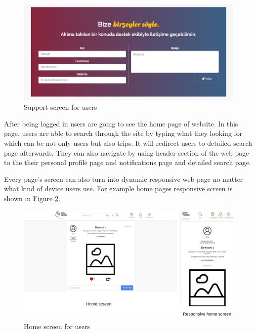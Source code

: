 \begin{figure}[!htbp]
\centering
\includegraphics[width=\textwidth]{projectChapters/images/supportPage.png}
\caption{Support screen for users}
\label{fig:supportWeb}
\end{figure}

\newpage

After being logged in users are going to see the home page of website. In this page, users are able to search through the site by typing what they looking for which can be not only users but also trips. It will redirect users to detailed search page afterwards. They can also navigate by using header section of the web page to the their personal profile page and notifications page and detailed search page.


Every page's screen can also turn into dynamic responsive web page no matter what kind of device users use. For example home pages responsive screen is shown in Figure  \ref{fig:homepageWeb}.

\begin{figure}[!htbp]
\centering
\includegraphics[width=\textwidth]{projectChapters/images/homepageWeb.png}
\caption{Home screen for users}
\label{fig:homepageWeb}
\end{figure}

